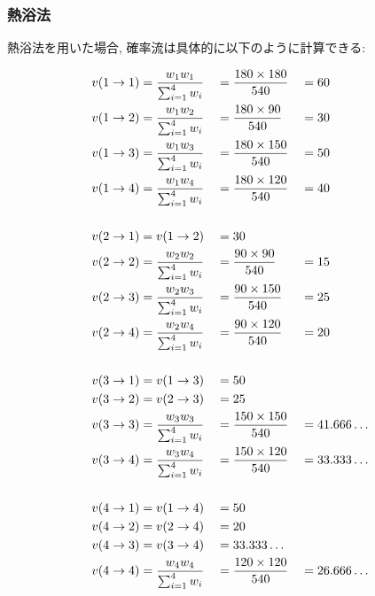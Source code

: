 \clearpage

\subsubsection{熱浴法}
熱浴法を用いた場合, 確率流は具体的に以下のように計算できる:

\begin{alignat}{4}
    v(1 \to 1) &= \frac{w_{1}w_{1}}{\sum_{i=1}^{4} w_{i}} && = \frac{180 \times 180}{540} &&= 60 \notag \\
    v(1 \to 2) &= \frac{w_{1}w_{2}}{\sum_{i=1}^{4} w_{i}} && = \frac{180 \times  90}{540} &&= 30 \notag \\
    v(1 \to 3) &= \frac{w_{1}w_{3}}{\sum_{i=1}^{4} w_{i}} && = \frac{180 \times 150}{540} &&= 50 \notag \\
    v(1 \to 4) &= \frac{w_{1}w_{4}}{\sum_{i=1}^{4} w_{i}} && = \frac{180 \times 120}{540} &&= 40 \notag \\
    \notag \\
    v(2 \to 1) &= v(1 \to 2) &&= 30 \notag \\
    v(2 \to 2) &= \frac{w_{2}w_{2}}{\sum_{i=1}^{4} w_{i}} && = \frac{ 90 \times  90}{540} &&= 15 \notag \\
    v(2 \to 3) &= \frac{w_{2}w_{3}}{\sum_{i=1}^{4} w_{i}} && = \frac{ 90 \times 150}{540} &&= 25 \notag \\
    v(2 \to 4) &= \frac{w_{2}w_{4}}{\sum_{i=1}^{4} w_{i}} && = \frac{ 90 \times 120}{540} &&= 20 \notag \\
    \notag \\
    v(3 \to 1) &= v(1 \to 3) &&= 50 \notag \\
    v(3 \to 2) &= v(2 \to 3) &&= 25 \notag \\
    v(3 \to 3) &= \frac{w_{3}w_{3}}{\sum_{i=1}^{4} w_{i}} && = \frac{150 \times 150}{540} &&= 41.666\ldots \notag \\
    v(3 \to 4) &= \frac{w_{3}w_{4}}{\sum_{i=1}^{4} w_{i}} && = \frac{150 \times 120}{540} &&= 33.333\ldots \notag \\
    \notag \\
    v(4 \to 1) &= v(1 \to 4) &&= 50 \notag \\
    v(4 \to 2) &= v(2 \to 4) &&= 20 \notag \\
    v(4 \to 3) &= v(3 \to 4) &&= 33.333\ldots \notag \\
    v(4 \to 4) &= \frac{w_{4}w_{4}}{\sum_{i=1}^{4} w_{i}} && = \frac{120 \times 120}{540} &&= 26.666\ldots \notag
\end{alignat}

